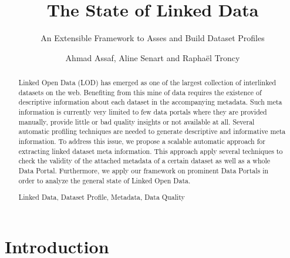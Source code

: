 \documentclass[runningheads,a4paper]{llncs}
\newcommand{\keywords}[1]{\par\addvspace\baselineskip
\noindent\keywordname\enspace\ignorespaces#1}
\begin{document}
\title{The State of Linked Data}
\subtitle{An Extensible Framework to Asses and Build Dataset Profiles}

\author{Ahmad Assaf, Aline Senart and Rapha\"{e}l Troncy }



\maketitle


\begin{abstract}
Linked Open Data (LOD) has emerged as one of the largest collection of interlinked datasets on the web. Benefiting from this mine of data requires the existence of descriptive information about each dataset in the accompanying metadata. Such meta information is currently very limited to few data portals where they are provided manually, provide little or bad quality insights or not available at all. Several automatic profiling techniques are needed to generate descriptive and informative meta information. To address this issue, we propose a scalable automatic approach for extracting linked dataset meta information. This approach apply several techniques to check the validity of the attached metadata of a certain dataset as well as a whole Data Portal. Furthermore, we apply our framework on prominent Data Portals in order to analyze the general state of Linked Open Data.
\keywords{Linked Data, Dataset Profile, Metadata, Data Quality}
\end{abstract}


\section{Introduction}
\label{sec:introduction}
\vspace{-0.4cm}



\nocite{*}

\end{document}

